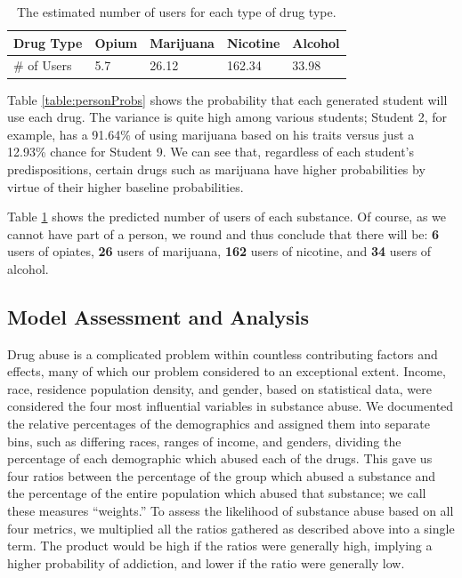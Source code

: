 \documentclass[12pt]{article}
\begin{document}
\begin{table}[]
\begin{tabular}{@{}lllll@{}}
\toprule
Drug Type   & Opium & Marijuana & Nicotine & Alcohol \\ \midrule
\# of Users & 5.7   & 26.12     & 162.34   & 33.98   \\ \bottomrule
\end{tabular}
\caption{The estimated number of users for each type of drug type.}
\label{table:totalUsers}
\end{table}

Table \ref{table:personProbs} shows the probability that each generated student will use each drug. The variance is quite high among various students; Student 2, for example, has a 91.64\% of using marijuana based on his traits versus just a 12.93\% chance for Student 9. We can see that, regardless of each student's predispositions, certain drugs such as marijuana have higher probabilities by virtue of their higher baseline probabilities.

Table \ref{table:totalUsers} shows the predicted number of users of each substance. Of course, as we cannot have part of a person, we round and thus conclude that there will be: \textbf{6} users of opiates, \textbf{26} users of marijuana, \textbf{162} users of nicotine, and \textbf{34} users of alcohol.

\subsection{Model Assessment and Analysis}
Drug abuse is a complicated problem within countless contributing factors and effects, many of which our problem considered to an exceptional extent. Income, race, residence population density, and gender, based on statistical data, were considered the four most influential variables in substance abuse. We documented the relative percentages of the demographics and assigned them into separate bins, such as differing races, ranges of income, and genders, dividing the percentage of each demographic which abused each of the drugs. This gave us four ratios between the percentage of the group which abused a substance and the percentage of the entire population which abused that substance; we call these measures “weights.”
To assess the likelihood of substance abuse based on all four metrics, we multiplied all the ratios gathered as described above into a single term. The product would be high if the ratios were generally high, implying a higher probability of addiction, and lower if the ratio were generally low. 
\end{document}
